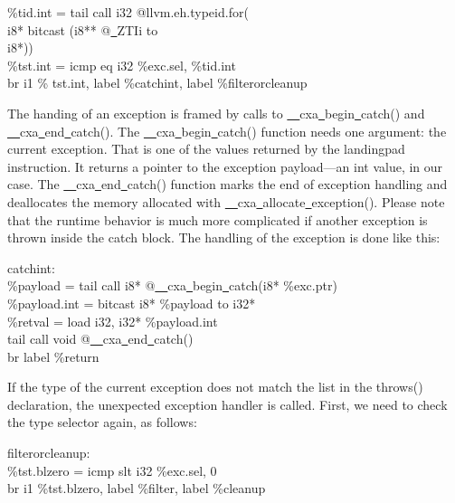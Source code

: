 \begin{tcolorbox}[colback=white,colframe=black]
\%tid.int = tail call i32 @llvm.eh.typeid.for( \\
\hspace*{6cm}i8* bitcast (i8** @\underline{~}ZTIi to  \\
\hspace*{6cm}i8*)) \\
\%tst.int = icmp eq i32 \%exc.sel, \%tid.int \\
br i1 \% tst.int, label \%catchint, label \%filterorcleanup
\end{tcolorbox}

The handing of an exception is framed by calls to \underline{~~}cxa\underline{~}begin\underline{~}catch() and \underline{~~}cxa\underline{~}end\underline{~}catch(). The \underline{~~}cxa\underline{~}begin\underline{~}catch() function needs one argument: the current exception. That is one of the values returned by the landingpad instruction. It returns a pointer to the exception payload—an int value, in our case. The \underline{~~}cxa\underline{~}end\underline{~}catch() function marks the end of exception handling and deallocates the memory allocated with \underline{~~}cxa\underline{~}allocate\underline{~}exception(). Please note that the runtime behavior is much more complicated if another exception is thrown inside the catch block. The handling of the exception is done like this:\par

\begin{tcolorbox}[colback=white,colframe=black]
catchint: \\
\%payload = tail call i8* @\underline{~~}cxa\underline{~}begin\underline{~}catch(i8* \%exc.ptr) \\
\%payload.int = bitcast i8* \%payload to i32* \\
\%retval = load i32, i32* \%payload.int \\
tail call void @\underline{~~}cxa\underline{~}end\underline{~}catch() \\
br label \%return
\end{tcolorbox}

If the type of the current exception does not match the list in the throws() declaration, the unexpected exception handler is called. First, we need to check the type selector again, as follows:\par

\begin{tcolorbox}[colback=white,colframe=black]
filterorcleanup: \\
\%tst.blzero = icmp slt i32 \%exc.sel, 0 \\
br i1 \%tst.blzero, label \%filter, label \%cleanup
\end{tcolorbox}

